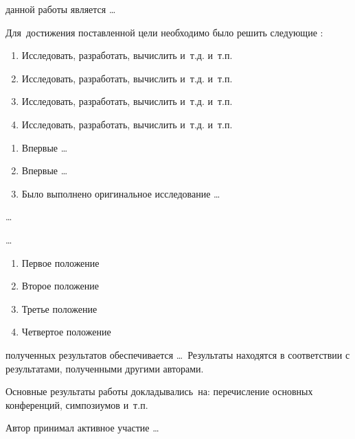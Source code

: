 
{\aim} данной работы является \ldots

Для~достижения поставленной цели необходимо было решить следующие {\tasks}:
\begin{enumerate}[beginpenalty=10000] %
  \item Исследовать, разработать, вычислить и~т.\:д. и~т.\:п.
  \item Исследовать, разработать, вычислить и~т.\:д. и~т.\:п.
  \item Исследовать, разработать, вычислить и~т.\:д. и~т.\:п.
  \item Исследовать, разработать, вычислить и~т.\:д. и~т.\:п.
\end{enumerate}


{\novelty}
\begin{enumerate}[beginpenalty=10000] %
  \item Впервые \ldots
  \item Впервые \ldots
  \item Было выполнено оригинальное исследование \ldots
\end{enumerate}

{\influence} \ldots

{\methods} \ldots

{}
\begin{enumerate}[beginpenalty=10000] %
  \item Первое положение
  \item Второе положение
  \item Третье положение
  \item Четвертое положение
\end{enumerate}

{\reliability} полученных результатов обеспечивается \ldots \ Результаты находятся в соответствии с результатами, полученными другими авторами.


{\probation}
Основные результаты работы докладывались~на:
перечисление основных конференций, симпозиумов и~т.\:п.

{\contribution} Автор принимал активное участие \ldots

